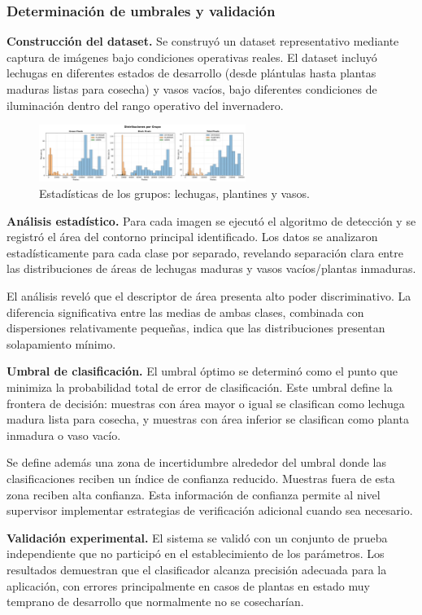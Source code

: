 \subsubsection{Determinación de umbrales y validación}

\textbf{Construcción del dataset.} Se construyó un dataset representativo mediante captura de imágenes bajo condiciones operativas reales. El dataset incluyó lechugas en diferentes estados de desarrollo (desde plántulas hasta plantas maduras listas para cosecha) y vasos vacíos, bajo diferentes condiciones de iluminación dentro del rango operativo del invernadero.

\begin{figure}[H]
    \centering
    \includegraphics[width=0.6\textwidth]{img/distribuciones.png}
    \caption{Estadísticas de los grupos: lechugas, plantines y vasos.}
    \label{fig:distribuciones}
\end{figure}

\textbf{Análisis estadístico.} Para cada imagen se ejecutó el algoritmo de detección y se registró el área del contorno principal identificado. Los datos se analizaron estadísticamente para cada clase por separado, revelando separación clara entre las distribuciones de áreas de lechugas maduras y vasos vacíos/plantas inmaduras.

El análisis reveló que el descriptor de área presenta alto poder discriminativo. La diferencia significativa entre las medias de ambas clases, combinada con dispersiones relativamente pequeñas, indica que las distribuciones presentan solapamiento mínimo.

\textbf{Umbral de clasificación.} El umbral óptimo se determinó como el punto que minimiza la probabilidad total de error de clasificación. Este umbral define la frontera de decisión: muestras con área mayor o igual se clasifican como lechuga madura lista para cosecha, y muestras con área inferior se clasifican como planta inmadura o vaso vacío.

Se define además una zona de incertidumbre alrededor del umbral donde las clasificaciones reciben un índice de confianza reducido. Muestras fuera de esta zona reciben alta confianza. Esta información de confianza permite al nivel supervisor implementar estrategias de verificación adicional cuando sea necesario.

\textbf{Validación experimental.} El sistema se validó con un conjunto de prueba independiente que no participó en el establecimiento de los parámetros. Los resultados demuestran que el clasificador alcanza precisión adecuada para la aplicación, con errores principalmente en casos de plantas en estado muy temprano de desarrollo que normalmente no se cosecharían.
